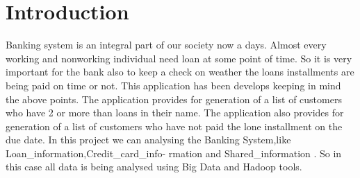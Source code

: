 
\chapter{Introduction}
Banking system is an integral part of our society now a days.
Almost every working and nonworking individual need loan at some point of time.
So it is very important for the bank also to keep a check on weather the loans installments are being paid on time or not.
This application has been develops keeping in mind the above points.
The application provides for generation of a list of customers who have 2 or more than  loans in their name.
The application also provides for generation of a list of customers who have not paid the lone installment on the due date. \newline
In this project we can analysing the Banking System,like Loan\_information,Credit\_card\_info-        rmation and Shared\_information . So in this case all data is being analysed using Big Data and Hadoop tools. 

